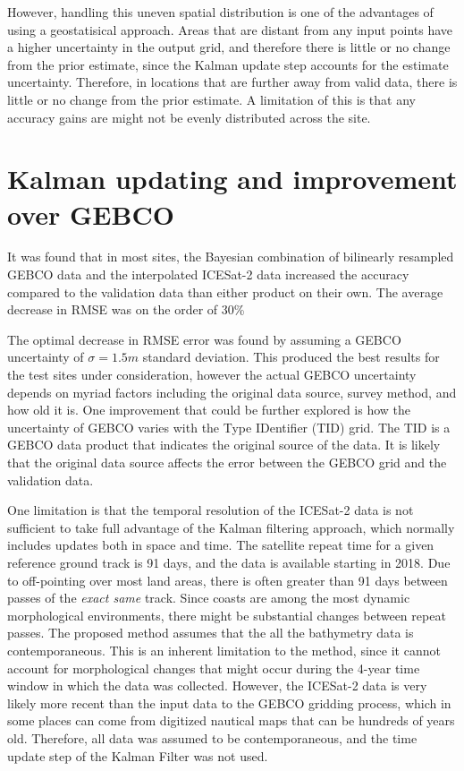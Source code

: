 However, handling this uneven spatial distribution is one of the advantages of using a geostatisical approach. Areas that are distant from any input points have a higher uncertainty in the output grid, and therefore there is little or no change from the prior estimate, since the Kalman update step accounts for the estimate uncertainty. Therefore, in locations that are further away from valid data, there is little or no change from the prior estimate. A limitation of this is that any accuracy gains are might not be evenly distributed across the site. 

\section{Kalman updating and improvement over GEBCO}

It was found that in most sites, the Bayesian combination of bilinearly resampled GEBCO data and the interpolated ICESat-2 data increased the accuracy compared to the validation data than either product on their own. The average decrease in RMSE was on the order of 30\% 

The optimal decrease in RMSE error was found by assuming a GEBCO uncertainty of $\sigma=1.5m$ standard deviation. This produced the best results for the test sites under consideration, however the actual GEBCO uncertainty depends on myriad factors including the original data source, survey method, and how old it is. One improvement that could be further explored is how the uncertainty of GEBCO varies with the Type IDentifier (TID) grid. The TID is a GEBCO data product that indicates the original source of the data. It is likely that the original data source affects the error between the GEBCO grid and the validation data.

One limitation is that the temporal resolution of the ICESat-2 data is not sufficient to take full advantage of the Kalman filtering approach, which normally includes updates both in space and time. The satellite repeat time for a given reference ground track is 91 days, and the data is available starting in 2018. Due to off-pointing over most land areas, there is often greater than 91 days between passes of the \emph{exact same} track. Since coasts are among the most dynamic morphological environments, there might be substantial changes between repeat passes. The proposed method assumes that the all the bathymetry data is contemporaneous. This is an inherent limitation to the method, since it cannot account for morphological changes that might occur during the 4-year time window in which the data was collected. However, the ICESat-2 data is very likely more recent than the input data to the GEBCO gridding process, which in some places can come from digitized nautical maps that can be hundreds of years old. Therefore, all data was assumed to be contemporaneous, and the time update step of the Kalman Filter was not used.


